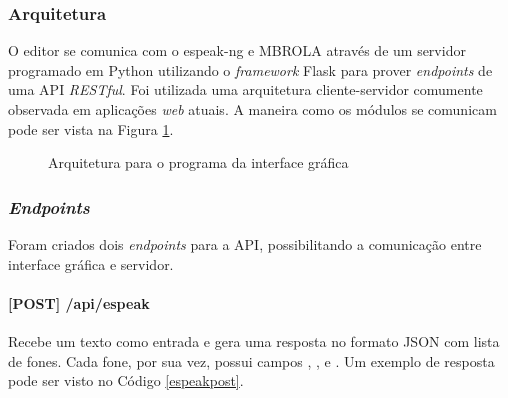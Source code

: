 \subsubsection{Arquitetura}
 O editor se comunica com o espeak-ng e MBROLA através de um
servidor programado em Python utilizando o \emph{framework} Flask para prover
\emph{endpoints} de uma API \emph{RESTful}. Foi utilizada uma arquitetura cliente-servidor \cite{rest} comumente observada em aplicações \emph{web} atuais. A maneira como os módulos se comunicam pode ser vista na Figura \ref{fig:arch}.

\begin{figure}[!htbp]
\centering
{}
\caption{Arquitetura para o programa da interface gráfica}
\label{fig:arch}
\end{figure}

\subsubsection{\emph{Endpoints}}
Foram criados dois \emph{endpoints} para a API, possibilitando a comunicação entre
interface gráfica e servidor.

\paragraph{[POST] /api/espeak} Recebe um texto como entrada e gera uma resposta
no formato JSON com lista de fones. Cada fone, por sua vez, possui campos ,
,  e . Um exemplo de resposta pode ser visto no Código \ref{espeakpost}.
